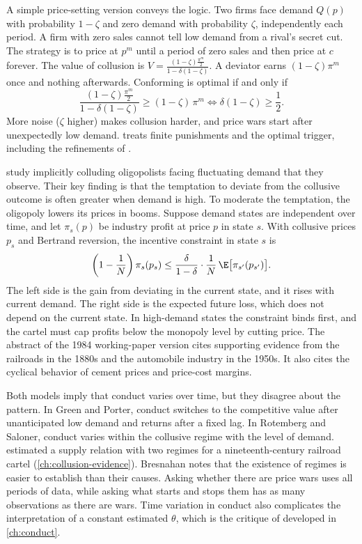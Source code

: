 A simple price-setting version conveys the logic. Two firms face demand $Q(p)$ with probability $1 - \zeta$ and
zero demand with probability $\zeta$, independently each period. A firm with zero sales cannot tell low demand from
a rival's secret cut. The strategy is to price at $p^m$ until a period of zero sales and then price at $c$
forever. The value of collusion is $V = \frac{(1 - \zeta)\frac{\pi^m}{2}}{1 - \delta(1 - \zeta)}$. A deviator earns
$(1 - \zeta)\pi^m$ once and nothing afterwards. Conforming is optimal if and only if
\begin{equation*}
\frac{(1 - \zeta)\frac{\pi^m}{2}}{1 - \delta(1 - \zeta)} \ge (1 - \zeta)\,\pi^m
\iff \delta(1 - \zeta) \ge \frac{1}{2} .
\end{equation*}
More noise ($\zeta$ higher) makes collusion harder, and price wars start after unexpectedly low demand.
 treats finite punishments and the optimal trigger, including the refinements of
\citet{AbreuPearceStacchetti1986}.

\citet{RotembergSaloner1986} study implicitly colluding oligopolists facing fluctuating demand that they observe.
Their key finding is that the temptation to deviate from the collusive outcome is often greater when demand is high.
To moderate the temptation, the oligopoly lowers its prices in booms. Suppose demand states are independent over
time, and let $\pi_s(p)$ be industry profit at price $p$ in state $s$. With collusive prices $p_s$ and Bertrand
reversion, the incentive constraint in state $s$ is
\begin{equation*}
\left(1 - \frac{1}{N}\right)\pi_s(p_s) \le \frac{\delta}{1 - \delta}\cdot\frac{1}{N}\,\E\bigl[\pi_{s'}(p_{s'})\bigr] .
\end{equation*}
The left side is the gain from deviating in the current state, and it rises with current demand. The right side is
the expected future loss, which does not depend on the current state. In high-demand states the constraint binds
first, and the cartel must cap profits below the monopoly level by cutting price. The abstract of the 1984 working-paper
version cites supporting evidence from the railroads in the 1880s and the automobile industry in the 1950s. It
also cites the cyclical behavior of cement prices and price-cost margins.

Both models imply that conduct varies over time, but they disagree about the pattern. In Green and Porter, conduct
switches to the competitive value after unanticipated low demand and returns after a fixed lag. In Rotemberg and
Saloner, conduct varies within the collusive regime with the level of demand. \citet{Porter1983} estimated a supply
relation with two regimes for a nineteenth-century railroad cartel (\cref{ch:collusion-evidence}). Bresnahan notes
that the existence of regimes is easier to establish than their causes. Asking whether there are price wars uses all
periods of data, while asking what starts and stops them has as many observations as there are wars. Time variation
in conduct also complicates the interpretation of a constant estimated $\theta$, which is the critique of
\citet{Corts1999} developed in \cref{ch:conduct}.

